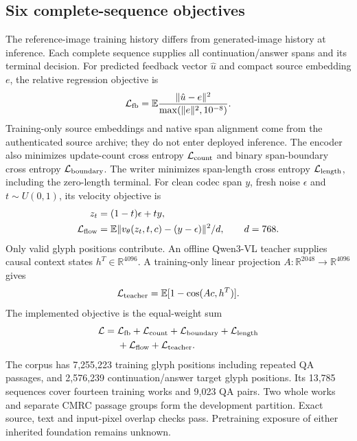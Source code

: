 \documentclass[12pt,a4paper]{article}
\begin{document}
\subsection*{Six complete-sequence objectives}
The reference-image training history differs from generated-image history at
inference. Each complete sequence supplies all continuation/answer spans and
its terminal decision. For predicted feedback vector $\hat u$ and compact
source embedding $e$, the relative regression objective is
\begin{equation}
 \mathcal L_{\rm fb}=\mathbb E
 \frac{\|\hat u-e\|^2}{\max(\|e\|^2,10^{-8})}.
\end{equation}
Training-only source embeddings and native span alignment come from the
authenticated source archive; they do not enter deployed inference. The
encoder also minimizes update-count cross entropy $\mathcal L_{\rm count}$
and binary span-boundary cross entropy $\mathcal L_{\rm boundary}$. The writer
minimizes span-length cross entropy $\mathcal L_{\rm length}$, including the
zero-length terminal. For clean codec span $y$, fresh noise $\epsilon$ and
$t\sim U(0,1)$, its velocity objective is
\begin{align}
 z_t&=(1-t)\epsilon+ty,\\
 \mathcal L_{\rm flow}&=\mathbb E\|v_\theta(z_t,t,c)-(y-\epsilon)\|^2/d,
 \qquad d=768.
\end{align}
Only valid glyph positions contribute. An offline Qwen3-VL teacher\cite{qwen3vl} supplies causal
context states $h^{T}\in\mathbb R^{4096}$. A training-only linear projection
$A:\mathbb R^{2048}\rightarrow\mathbb R^{4096}$ gives
\begin{equation}
 \mathcal L_{\rm teacher}=\mathbb E[1-\cos(Ac,h^{T})].
\end{equation}
The implemented objective is the equal-weight sum
\begin{align}
 \mathcal L={}&\mathcal L_{\rm fb}+\mathcal L_{\rm count}
 +\mathcal L_{\rm boundary}+\mathcal L_{\rm length}\nonumber\\
 &+\mathcal L_{\rm flow}+\mathcal L_{\rm teacher}.
\end{align}
The corpus has 7,255,223 training glyph positions including repeated QA
passages, and 2,576,239 continuation/answer target glyph positions. Its
13,785 sequences cover fourteen training works and 9,023 QA pairs. Two whole
works and separate CMRC passage groups form the development partition.
Exact source, text and input-pixel overlap checks pass. Pretraining exposure
of either inherited foundation remains unknown.
\end{document}

